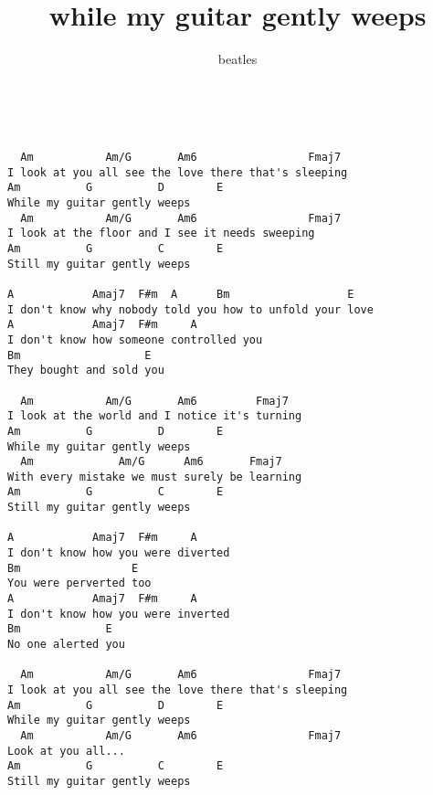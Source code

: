 \author{beatles}
\title{while my guitar gently weeps}
\maketitle
\begin{verbatim}

 
  Am           Am/G       Am6                 Fmaj7
I look at you all see the love there that's sleeping
Am          G          D        E
While my guitar gently weeps
  Am           Am/G       Am6                 Fmaj7
I look at the floor and I see it needs sweeping
Am          G          C        E
Still my guitar gently weeps
 
A            Amaj7  F#m  A      Bm                  E
I don't know why nobody told you how to unfold your love
A            Amaj7  F#m     A
I don't know how someone controlled you
Bm                   E
They bought and sold you
 
  Am           Am/G       Am6         Fmaj7
I look at the world and I notice it's turning
Am          G          D        E
While my guitar gently weeps
  Am             Am/G      Am6       Fmaj7
With every mistake we must surely be learning
Am          G          C        E
Still my guitar gently weeps
 
A            Amaj7  F#m     A
I don't know how you were diverted
Bm                 E
You were perverted too
A            Amaj7  F#m     A
I don't know how you were inverted
Bm             E
No one alerted you
 
  Am           Am/G       Am6                 Fmaj7
I look at you all see the love there that's sleeping
Am          G          D        E
While my guitar gently weeps
  Am           Am/G       Am6                 Fmaj7
Look at you all...
Am          G          C        E
Still my guitar gently weeps
\end{verbatim}